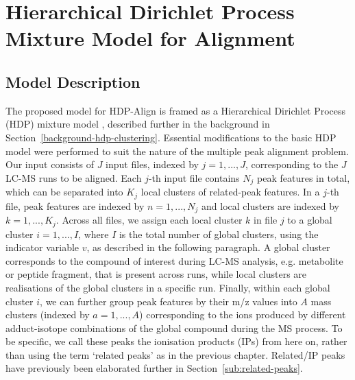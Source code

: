 \section{Hierarchical Dirichlet Process Mixture Model for Alignment}

\subsection{Model Description}

The proposed model for HDP-Align is framed as a Hierarchical Dirichlet Process (HDP) mixture model \cite{Teh2006}, described further in the background in Section~\ref{background-hdp-clustering}. Essential modifications to the basic HDP model were performed to suit the nature of the multiple peak alignment problem. Our input consists of $J$ input files, indexed by $j=1,...,J$, corresponding to the $J$ LC-MS runs to be aligned. Each $j$-th input file contains $N_j$ peak features in total, which can be separated into $K_j$ local clusters of related-peak features. In a $j$-th file, peak features are indexed by $n=1,...,N_j$ and local clusters are indexed by $k=1,...,K_j$. Across all files, we assign each local cluster $k$ in file $j$ to a global cluster $i=1,...,I$, where $I$ is the total number of global clusters, using the indicator variable $v$, as described in the following paragraph. A global cluster corresponds to the compound of interest during LC-MS analysis, e.g. metabolite or peptide fragment, that is present across runs, while local clusters are realisations of the global clusters in a specific run. Finally, within each global cluster $i$, we can further group peak features by their m/z values into $A$ mass clusters (indexed by $a=1,...,A$) corresponding to the ions produced by different adduct-isotope combinations of the global compound during the MS process. To be specific, we call these peaks the ionisation products (IPs) from here on, rather than using the term `related peaks' as in the previous chapter. Related/IP peaks have previously been elaborated further in Section~\ref{sub:related-peaks}.

%		

